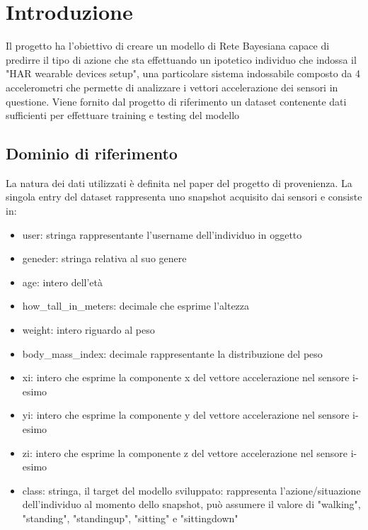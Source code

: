 \documentclass[12pt]{article}
\begin{document}

\tableofcontents
\pagebreak




\section{Introduzione}
Il progetto ha l'obiettivo di creare un modello di Rete Bayesiana capace di predirre il tipo di azione che sta effettuando un ipotetico individuo che indossa il "HAR wearable devices setup", una particolare sistema indossabile composto da 4 accelerometri che permette di analizzare i vettori accelerazione dei sensori in questione. Viene fornito dal progetto di riferimento\cite{HAR} un dataset contenente dati sufficienti per effettuare training e testing del modello

\subsection{Dominio di riferimento}
La natura dei dati utilizzati è definita nel paper\cite{Paper} del progetto di provenienza. La singola entry del dataset rappresenta uno snapshot acquisito dai sensori e consiste in:
\begin{itemize}
	\item user: stringa rappresentante l'username dell'individuo in oggetto
	\item geneder: stringa relativa al suo genere
	\item age: intero dell'età
	\item how\_tall\_in\_meters: decimale che esprime l'altezza
	\item weight: intero riguardo al peso
	\item body\_mass\_index: decimale rappresentante la distribuzione del peso
	\item xi: intero che esprime la componente x del vettore accelerazione nel sensore i-esimo
	\item yi: intero che esprime la componente y del vettore accelerazione nel sensore i-esimo
	\item zi: intero che esprime la componente z del vettore accelerazione nel sensore i-esimo
	\item class: stringa, il target del modello sviluppato: rappresenta l'azione/situazione dell'individuo al momento dello snapshot, può assumere il valore di "walking", "standing", "standingup", "sitting" e "sittingdown"
\end{itemize}
\end{document}
